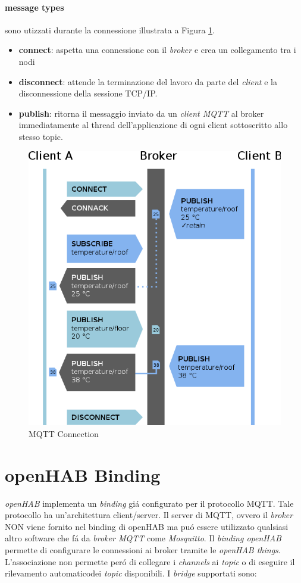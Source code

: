 \paragraph{message types} sono utizzati durante la connessione illustrata a Figura \ref{fig:mqtt_connection}.
\begin{itemize}
    \item \textbf{connect}: aspetta una connessione con il {\em broker} e crea un collegamento tra i nodi
    \item \textbf{disconnect}: attende la terminazione del lavoro da parte del {\em client} e la disconnessione della sessione TCP/IP.
    \item \textbf{publish}: ritorna il messaggio inviato da un {\em client MQTT} al broker immediatamente al thread dell'applicazione di ogni client sottoscritto allo stesso topic.
\end{itemize}

\begin{figure}
    \centering
    \includegraphics[width=12cm]{Immagini/mqtt_connection.png}
    \caption{MQTT Connection}
    \label{fig:mqtt_connection}
\end{figure}

\section{openHAB Binding}
{\em openHAB} implementa un {\em binding} gi\'a configurato per il protocollo MQTT. Tale protocollo ha un'architettura client/server. Il server di MQTT, ovvero il {\em broker} NON viene fornito nel binding di openHAB ma pu\'o essere utilizzato qualsiasi altro software che f\'a da {\em broker MQTT} come {\em Mosquitto}. Il {\em binding openHAB} permette di configurare le connessioni ai broker tramite le {\em openHAB things}. L'associazione non permette per\'o di collegare i {\em channels} ai {\em topic} o di eseguire il rilevamento automaticodei {\em topic} disponibili. I {\em bridge} supportati sono: 

